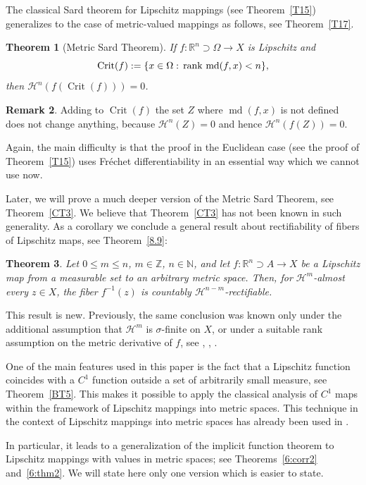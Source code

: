 \documentclass[12pt,leqno]{amsart}
\newtheorem{theorem}{Theorem}
\theoremstyle{definition}
\newtheorem{remark}[theorem]{Remark}
\newcommand{\bbbn}{\mathbb N}
\newcommand{\bbbz}{\mathbb Z}
\newcommand{\bbbr}{\mathbb R}
\def\H{{\mathcal H}}
\def\rank{{\rm rank\,}}
\def\md{\operatorname{md}}
\numberwithin{theorem}{section} \numberwithin{equation}{section}
\begin{document}
The classical Sard theorem for Lipschitz mappings (see Theorem~\ref{T15}) generalizes to the case of metric-valued mappings as follows, see Theorem~\ref{T17}.
\begin{theorem}[Metric Sard Theorem]
\label{INT6}
If $f:\mathbb{R}^n\supset\Omega\to X$ is Lipschitz and
$$
\operatorname{Crit}(f):=\{x\in\Omega:\, \rank\md (f,x)<n\},
$$
then $\mathcal{H}^n(f(\operatorname{Crit}(f)))=0$.
\end{theorem}
\begin{remark}
Adding to $\operatorname{Crit}(f)$ the set $Z$ where $\md(f,x)$ is not defined does not change anything, because $\H^n(Z)=0$ and hence $\H^n(f(Z))=0$.
\end{remark}

Again, the main difficulty is that the proof in the Euclidean case (see the proof of Theorem~\ref{T15}) uses Fr\'echet differentiability in an essential way which we cannot use now.

Later, we will prove a much deeper version of the Metric Sard Theorem, see Theorem~\ref{CT3}. We believe that Theorem~\ref{CT3} has not been known in such generality. As a corollary we conclude a general result about rectifiability of fibers of Lipschitz maps, see Theorem~\ref{8.9}:
\begin{theorem}
Let $0\leq m\leq n$, $m\in\bbbz$, $n\in\bbbn$, and let
$f:\bbbr^n\supset A\to X$ be a Lipschitz map from a measurable set to an arbitrary metric space. Then, for
$\mathcal{H}^m$-almost every $z\in X$, the fiber $f^{-1}(z)$ is
countably $\mathcal{H}^{n-m}$-rectifiable.
\end{theorem}
This result is new. Previously, the same conclusion was known only under the additional assumption that $\H^m$ is $\sigma$-finite on $X$, or under a suitable rank assumption on the metric derivative of $f$, see
\cite[Corollary~1.8]{HZ}, \cite[Theorem~1.2]{kar}, \cite[Theorem~4.16]{reichel}.



One of the main features used in this paper is the fact that a Lipschitz function coincides with a $C^1$ function outside a set of arbitrarily small measure, see Theorem~\ref{BT5}. This makes it possible to apply the classical analysis of $C^1$ maps within the framework of Lipschitz mappings into metric spaces. This technique in the context of Lipschitz mappings into metric spaces has already been used in \cite{hajlaszma,HMZ,HZ}.

In particular, it leads to a generalization of the implicit function theorem to Lipschitz mappings with values in metric spaces; see Theorems~\ref{6:corr2} and~\ref{6:thm2}. We will state here only one version which is easier to state.
\end{document}
